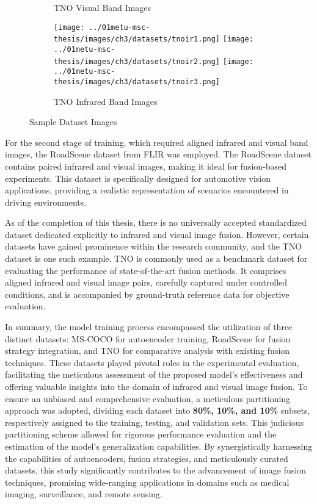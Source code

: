 \begin{figure}[htbp]
\begin{subfigure}[b]{\textwidth}
        \caption{TNO \cite{toet2014tno} Visual Band Images}
        \label{fig:ch3:tno}
    \end{subfigure}
    \vspace{0.01cm}
    \begin{subfigure}[b]{\textwidth}
        \texttt{[image: ../01metu-msc-thesis/images/ch3/datasets/tnoir1.png]}
        \texttt{[image: ../01metu-msc-thesis/images/ch3/datasets/tnoir2.png]}
        \texttt{[image: ../01metu-msc-thesis/images/ch3/datasets/tnoir3.png]}
        \caption{TNO \cite{toet2014tno} Infrared Band Images}
    \end{subfigure} 
    \caption{Sample Dataset Images}
    \label{fig:ch3:dataset}
\end{figure}

For the second stage of training, which required aligned infrared and visual band images, the RoadScene dataset from FLIR was employed. The RoadScene \cite{xu2020aaai} dataset contains paired infrared and visual images, making it ideal for fusion-based experiments. This dataset is specifically designed for automotive vision applications, providing a realistic representation of scenarios encountered in driving environments.

As of the completion of this thesis, there is no universally accepted standardized dataset dedicated explicitly to infrared and visual image fusion. However, certain datasets have gained prominence within the research community, and the TNO dataset is one such example. TNO \cite{toet2014tno} is commonly used as a benchmark dataset for evaluating the performance of state-of-the-art fusion methods. It comprises aligned infrared and visual image pairs, carefully captured under controlled conditions, and is accompanied by ground-truth reference data for objective evaluation.

In summary, the model training process encompassed the utilization of three distinct datasets: MS-COCO for autoencoder training, RoadScene for fusion strategy integration, and TNO for comparative analysis with existing fusion techniques. These datasets played pivotal roles in the experimental evaluation, facilitating the meticulous assessment of the proposed model's effectiveness and offering valuable insights into the domain of infrared and visual image fusion. To ensure an unbiased and comprehensive evaluation, a meticulous partitioning approach was adopted, dividing each dataset into \textbf{80\%, 10\%, and 10\%} subsets, respectively assigned to the training, testing, and validation sets. This judicious partitioning scheme allowed for rigorous performance evaluation and the estimation of the model's generalization capabilities. By synergistically harnessing the capabilities of autoencoders, fusion strategies, and meticulously curated datasets, this study significantly contributes to the advancement of image fusion techniques, promising wide-ranging applications in domains such as medical imaging, surveillance, and remote sensing.

